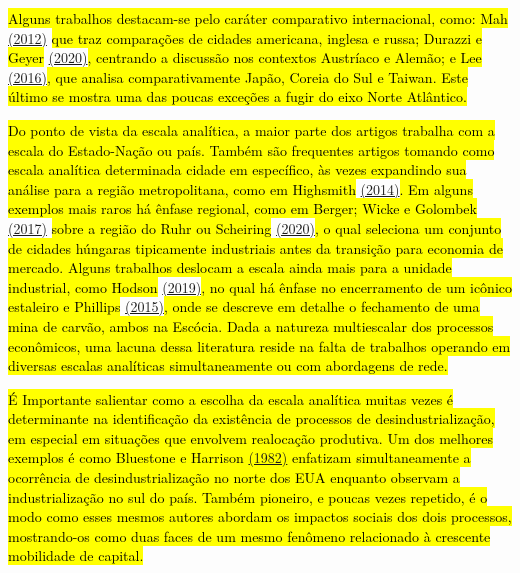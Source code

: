 \hl{Alguns trabalhos destacam-se pelo caráter comparativo internacional,
como: Mah} \href{https://www.zotero.org/google-docs/?qWOBi4}{(2012)}
\hl{que traz comparações de cidades americana, inglesa e russa; Durazzi
e Geyer} \href{https://www.zotero.org/google-docs/?7BvhKX}{(2020)}\hl{,
centrando a discussão nos contextos Austríaco e Alemão; e Lee}
\href{https://www.zotero.org/google-docs/?2GMa3o}{(2016)}\hl{, que
analisa comparativamente Japão, Coreia do Sul e Taiwan. Este último se
mostra uma das poucas exceções a fugir do eixo Norte Atlântico.}

\hl{Do ponto de vista da escala analítica, a maior parte dos artigos
trabalha com a escala do Estado-Nação ou país. Também são frequentes
artigos tomando como escala analítica determinada cidade em específico,
às vezes expandindo sua análise para a região metropolitana, como em
Highsmith}
\href{https://www.zotero.org/google-docs/?GOOAao}{(2014)}\hl{. Em alguns
exemplos mais raros há ênfase regional, como em Berger; Wicke e
Golombek} \href{https://www.zotero.org/google-docs/?WBJ1XC}{(2017)}
\hl{sobre a região do Ruhr ou Scheiring}
\href{https://www.zotero.org/google-docs/?hUQSGX}{(2020)}\hl{, o qual
seleciona um conjunto de cidades húngaras tipicamente industriais antes
da transição para economia de mercado. Alguns trabalhos deslocam a
escala ainda mais para a unidade industrial, como Hodson}
\href{https://www.zotero.org/google-docs/?bh9WW6}{(2019)}\hl{, no qual
há ênfase no encerramento de um icônico estaleiro e Phillips}
\href{https://www.zotero.org/google-docs/?nAwPpr}{(2015)}\hl{, onde se
descreve em detalhe o fechamento de uma mina de carvão, ambos na
Escócia. Dada a natureza multiescalar dos processos econômicos, uma
lacuna dessa literatura reside na falta de trabalhos operando em
diversas escalas analíticas simultaneamente ou com abordagens de rede.}

\hl{É Importante salientar como a escolha da escala analítica muitas
vezes é determinante na identificação da existência de processos de
desindustrialização, em especial em situações que envolvem realocação
produtiva. Um dos melhores exemplos é como Bluestone e Harrison
\href{https://www.zotero.org/google-docs/?fH32OW}{(1982)} enfatizam
simultaneamente a ocorrência de desindustrialização no norte dos EUA
enquanto observam a industrialização no sul do país. Também pioneiro, e
poucas vezes repetido, é o modo como esses mesmos autores abordam os
impactos sociais dos dois processos, mostrando-os como duas faces de um
mesmo fenômeno relacionado à crescente mobilidade de capital.}

